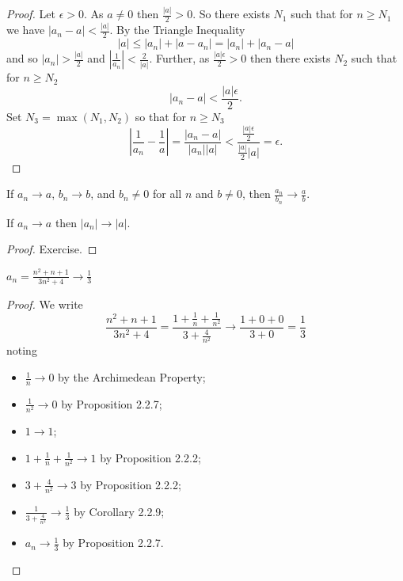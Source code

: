 \documentclass[11pt]{article}
\begin{document}
\begin{proof}
    Let $\epsilon > 0$. As $a \neq 0$ then $\frac{|a|}{2} > 0$. So there exists $N_1$ such that for $n \geq N_1$ we have $|a_n - a| < \frac{|a|}{2}$. By the Triangle Inequality
    \[
        |a| \leq |a_n| + |a - a_n| = |a_n| + |a_n - a|
    \]
    and so $|a_n| > \frac{|a|}{2}$ and $\left|\frac{1}{a_n}\right| <
        \frac{2}{|a|}$. Further, as $\frac{|a| \epsilon}{2} > 0$ then there exists
    $N_2$ such that for $n \geq N_2$
    \[
        |a_n - a| < \frac{|a| \epsilon}{2}.
    \]
    Set $N_3 = \max(N_1, N_2)$ so that for $n \geq N_3$
    \[
        \left|\frac{1}{a_n} - \frac{1}{a}\right| = \frac{|a_n - a|}{|a_n| |a|} < \frac{\frac{|a| \epsilon}{2}}{\frac{|a|}{2} |a|} = \epsilon.
    \]
\end{proof}

\begin{corollary}
    If $a_n \to a$, $b_n \to b$, and $b_n \neq 0$ for all $n$ and $b \neq 0$, then $\frac{a_n}{b_n} \to \frac{a}{b}$.
\end{corollary}

\begin{proposition}
    If $a_n \to a$ then $|a_n| \to |a|$.
\end{proposition}

\begin{proof}
    Exercise.
\end{proof}

\begin{example}
    $a_n = \frac{n^2 + n + 1}{3n^2 + 4} \to \frac{1}{3}$
\end{example}

\begin{proof}
    We write
    \[
        \frac{n^2 + n + 1}{3n^2 + 4} = \frac{1 + \frac{1}{n} + \frac{1}{n^2}}{3 + \frac{4}{n^2}} \to \frac{1 + 0 + 0}{3 + 0} = \frac{1}{3}
    \]
    noting
    \begin{itemize}
        \item $\frac{1}{n} \to 0$ by the Archimedean Property;
        \item $\frac{1}{n^2} \to 0$ by Proposition 2.2.7;
        \item $1 \to 1$;
        \item $1 + \frac{1}{n} + \frac{1}{n^2} \to 1$ by Proposition 2.2.2;
        \item $3 + \frac{4}{n^2} \to 3$ by Proposition 2.2.2;
        \item $\frac{1}{3 + \frac{4}{n^2}} \to \frac{1}{3}$ by Corollary 2.2.9;
        \item $a_n \to \frac{1}{3}$ by Proposition 2.2.7.
    \end{itemize}
\end{proof}
\end{document}

